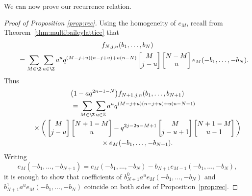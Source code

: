 We can now prove our recurrence relation.
\begin{proof}[Proof of Proposition \ref{prop:rec}]
Using the homogeneity of $e_M$, recall from Theorem~\ref{thm:multibaileylattice} that
\begin{gather*}
f_{N,j,n}(b_1,\ldots,b_N)\\
\qquad= \sum_{M \in \Z} \sum_{u \in \Z} a^{u}q^{(M-j+u)(n-j+u)+u(n-N)} \begin{bmatrix}
M\\
j-u
\end{bmatrix} \begin{bmatrix}
N-M\\
u
\end{bmatrix} e_M(-b_1, \dots , -b_N).
\end{gather*}
Thus
\begin{gather}
\bigl(1-aq^{2n-1-N}\bigr)f_{N+1,j,n}(b_1,\ldots,b_{N+1})\nonumber \\
\qquad= \sum_{M \in \Z} \sum_{u\in \mathbb{Z}} a^{u}q^{(M-j+u)(n-j+u)+u(n-N-1)}\nonumber\\
\phantom{\qquad=}{}\times\bigg( \begin{bmatrix}
M\\
j-u
\end{bmatrix} \begin{bmatrix}
N+1-M\\
u
\end{bmatrix}
-q^{2j-2u-M+1}\begin{bmatrix}
M\\
j-u+1
\end{bmatrix} \begin{bmatrix}
N+1-M\\
u-1
\end{bmatrix} \bigg)\nonumber\\
\phantom{\qquad=}{}\times e_M(-b_1, \dots , -b_{N+1}).\label{eq:lastline}
\end{gather}
Writing
\begin{equation*}e_M(-b_1, \dots , -b_{N+1})=e_M(-b_1, \dots , -b_{N})-b_{N+1}e_{M-1}(-b_1, \dots , -b_{N}),
\end{equation*}
it is enough to show that coefficients of $b_{N+1}^0a^ue_M(-b_1, \dots , -b_{N})$ and $b_{N+1}^1a^ue_M(-b_1, \dots , -b_{N})$ coincide on both sides of Proposition~\ref{prop:rec}.


\end{proof}
